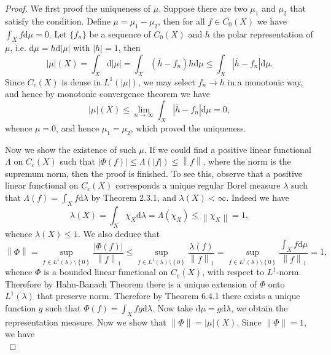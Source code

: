 \begin{proof}
We first proof the uniqueness of $\mu$. Suppose there are two $\mu_1$ and $\mu_2$ that satisfy the condition. Define $\mu=\mu_1-\mu_2$, then for all $f\in C_0(X)$ we have $\int_Xf\mathrm{d}\mu=0$. Let $\{f_n\}$ be a sequence of $C_0(X)$ and $h$ the polar representation of $\mu$, i.e. $\mathrm{d}\mu=h\mathrm{d}|\mu|$ with $|h|=1$, then 
$$
\left| \mu \right|\left( X \right) =\int_X{\mathrm{d}\left| \mu \right|}=\int_X{\left( \overline{h}-f_n \right) h\mathrm{d}\mu}\le \int_X{\left| \overline{h}-f_n \right|\mathrm{d}\mu}.
$$
Since $C_c(X)$ is dense in $L^1(|\mu|)$, we may select $f_n\to h$ in a monotonic way, and hence by monotonic convergence theorem we have 
$$
\left| \mu \right|\left( X \right) \le \lim_{n\rightarrow \infty} \int_X{\left| \overline{h}-f_n \right|\mathrm{d}\mu}=0,
$$
whence $\mu=0$, and hence $\mu_1=\mu_2$, which proved the uniqueness.\par
Now we show the existence of such $\mu$. If we could find a positive linear functional $\Lambda$ on $C_c(X)$ such that $\left| \Phi \left( f \right) \right|\le \Lambda \left( \left| f \right| \right) \le \left\| f \right\| $, where the norm is the supremum norm, then the proof is finished. To see this, observe that a positive linear functional on $C_c(X)$ corresponds a unique regular Borel measure $\lambda$ such that $\Lambda(f)=\int_Xf\mathrm{d}\lambda$ by Theorem 2.3.1, and $\lambda(X)<\infty$. Indeed we have 
$$
\lambda \left( X \right) =\int_X{\chi _X\mathrm{d}\lambda}=\Lambda \left( \chi _X \right) \le \left\| \chi _X \right\| =1,
$$
whence $\lambda(X)\le 1$. We also deduce that 
$$
\left\| \Phi \right\| =\mathop {\mathrm{sup}} \limits_{f\in L^1\left( \lambda \right) \setminus \left\{ 0 \right\}}\frac{\left| \Phi \left( f \right) \right|}{\left\| f \right\| _1}\le \mathop {\mathrm{sup}} \limits_{f\in L^1\left( \lambda \right) \setminus \left\{ 0 \right\}}\frac{\lambda \left( f \right)}{\left\| f \right\| _1}=\mathop {\mathrm{sup}} \limits_{f\in L^1\left( \lambda \right) \setminus \left\{ 0 \right\}}\frac{\int_X{f\mathrm{d}\mu}}{\left\| f \right\| _1}=1,
$$
whence $\Phi$ is a bounded linear functional on $C_c(X)$, with respect to $L^1$-norm. Therefore by Hahn-Banach Theorem there is a unique extension of $\Phi$ onto $L^1(\lambda)$ that preserve norm. Therefore by Theorem 6.4.1 there exists a unique function $g$ such that $\Phi(f)=\int_Xfg\mathrm{d}\lambda$. Now take $\mathrm{d}\mu=g\mathrm{d}\lambda$, we obtain the representation measure. Now we show that $\|\Phi\|=|\mu|(X)$. Since $\|\Phi\|=1$, we have 
$$
$$
\end{proof}
